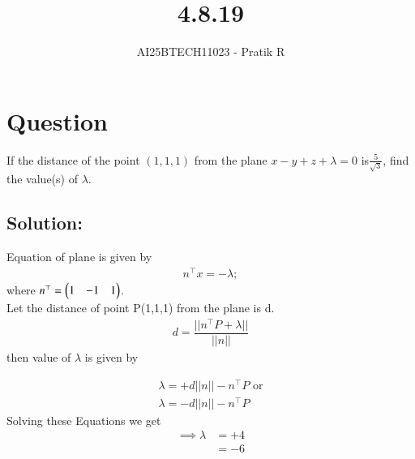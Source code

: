\documentclass[journal]{IEEEtran}
\begin{document}

\vspace{3cm}

\title{4.8.19}
\author{AI25BTECH11023 - Pratik R}
{\let\newpage\relax\maketitle}

\renewcommand{\thefigure}{\theenumi}
\renewcommand{\thetable}{\theenumi}
\setlength{\intextsep}{10pt} %


\renewcommand{\thetable}{\theenumi}


\section*{\textbf{Question}}
If the distance of the point $(1,1,1)$ from the plane $x-y+z+ \lambda = 0$ is$\frac{5}{\sqrt{3}}$, find the value(s) of $\lambda$.

\subsection*{\textbf{Solution:}} 
Equation of plane is given by
\begin{align}
    n^\top x = -\lambda;
\end{align}
where $n^\top = \begin{pmatrix}1&-1&1\end{pmatrix}$. \\

Let the distance of point P(1,1,1) from the plane is d.
\begin{align}
d = \dfrac{||n^\top P + \lambda||}{||n||}
\end{align}
then value of $\lambda $ is given by

\begin{align}
    \lambda = + d||n||-n^\top P \text{ or} \\
    \lambda = - d||n||-n^\top P
\end{align}
Solving these Equations we get
\begin{align}
   \implies \lambda &= +4 \\
    &=-6
\end{align}
\newpage
\end{document}
